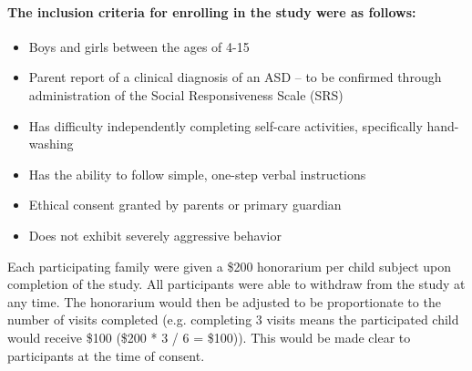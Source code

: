 \paragraph{The \textbf{inclusion criteria} for enrolling in the study were as follows:}
\begin{itemize}
	\item Boys and girls between the ages of 4-15
	\item Parent report of a clinical diagnosis of an ASD – to be confirmed through administration of the Social Responsiveness Scale (SRS)
	\item Has difficulty independently completing self-care activities, specifically hand-washing
	\item Has the ability to follow simple, one-step verbal instructions
	\item Ethical consent  granted by parents or primary guardian
	\item Does not exhibit severely aggressive behavior
\end{itemize}

Each participating family were given a \$200 honorarium per child subject upon completion of the study. All participants were able to withdraw from the study at any time. The honorarium would then be adjusted to be proportionate to the number of visits completed (e.g. completing 3 visits means the participated child would receive \$100 (\$200 * 3 / 6 = \$100)). This would be made clear to participants at the time of consent.